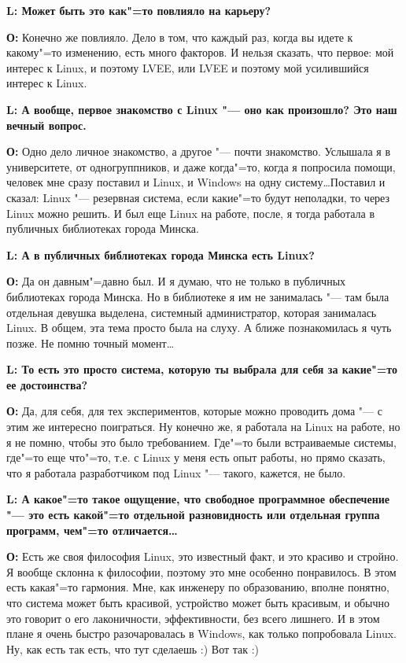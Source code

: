 \documentclass[10pt, a5paper]{article}
\begin{document}
{\noindent \bf L: Может быть это как"=то повлияло на карьеру?}

{\noindent \bf О:} Конечно же повлияло. Дело в том, что каждый раз, когда вы идете к какому"=то изменению, есть много факторов. И нельзя сказать, что первое: мой интерес к Linux, и поэтому LVEE, или LVEE и поэтому мой усилившийся интерес к Linux.

{\noindent \bf L: А вообще, первое знакомство с Linux "--- оно как произошло? Это наш вечный вопрос.}

{\noindent \bf О:} Одно дело личное знакомство, а другое "--- почти знакомство. Услышала я в университете, от одногруппников, и даже когда"=то, когда я попросила помощи, человек мне сразу поставил и Linux, и Windows на одну систему\ldots Поставил и сказал: Linux "--- резервная система, если какие"=то будут неполадки, то через Linux можно решить. И был еще Linux на работе, после, я тогда работала в публичных библиотеках города Минска.

{\noindent \bf L: А в публичных библиотеках города Минска есть Linux?}

{\noindent \bf О:} Да он давным"=давно был. И я думаю, что не только в публичных библиотеках города Минска. Но в библиотеке я им не занималась "--- там была отдельная девушка выделена, системный администратор, которая занималась Linux. В общем, эта тема просто была на слуху. А ближе познакомилась я чуть позже. Не помню точный момент\ldots

{\noindent \bf L: То есть это просто система, которую ты выбрала для себя за какие"=то ее достоинства?}

{\noindent \bf О:} Да, для себя, для тех экспериментов, которые можно проводить дома "--- с этим же интересно поиграться. Ну конечно же, я работала на Linux на работе, но я не помню, чтобы это было требованием. Где"=то были встраиваемые системы, где"=то еще что"=то, т.е. с Linux у меня есть опыт работы, но прямо сказать, что я работала разработчиком под Linux "--- такого, кажется, не было. 

{\noindent \bf L: А какое"=то такое ощущение, что свободное программное обеспечение "--- это есть какой"=то отдельной разновидность или отдельная группа программ, чем"=то отличается\ldots}

{\noindent \bf О:} Есть же своя философия Linux, это известный факт, и это красиво и стройно. Я вообще склонна к философии, поэтому это мне особенно понравилось. В этом есть какая"=то гармония. Мне, как инженеру по образованию, вполне понятно, что система может быть красивой, устройство может быть красивым, и обычно это говорит о его лаконичности, эффективности, без всего лишнего. И в этом плане я очень быстро разочаровалась в Windows, как только попробовала Linux. Ну, как есть так есть, что тут сделаешь :) Вот так :)
\end{document}
